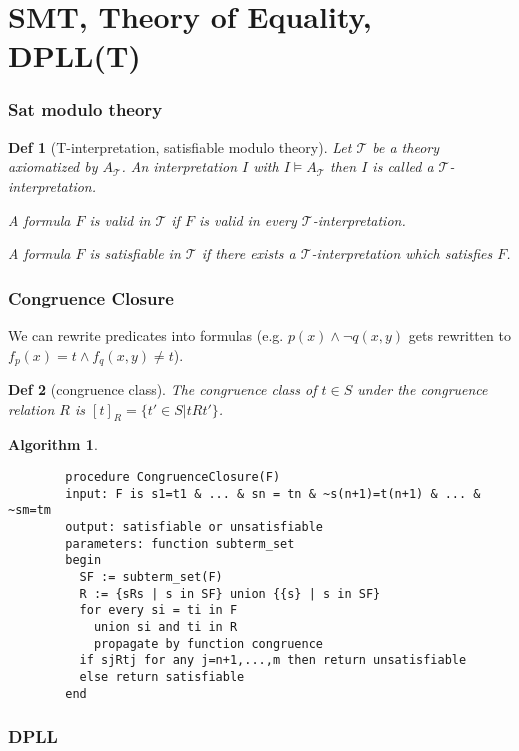 \documentclass[]{article}
\newtheorem*{definition*}{Def}
\newtheorem{algorithm}{Algorithm}
\begin{document}
\section{SMT, Theory of Equality, DPLL(T)}

\subsubsection{Sat modulo theory}

\begin{definition*}[T-interpretation, satisfiable modulo theory]
	Let $\mathcal{T}$ be a theory axiomatized by $A_\mathcal{T}$. An interpretation $I$ with $I \models A_\mathcal{T}$ then $I$ is called a $\mathcal{T}$-interpretation.
	
	A formula $F$ is valid in $\mathcal{T}$ if $F$ is valid in every $\mathcal{T}$-interpretation.
	
	A formula $F$ is satisfiable in $\mathcal{T}$ if there exists a $\mathcal{T}$-interpretation which satisfies $F$.
\end{definition*}

\subsubsection{Congruence Closure}

We can rewrite predicates into formulas (e.g. $p(x) \land \lnot q(x,y)$ gets rewritten to $f_p(x) = t \land f_q(x,y) \not= t$).

\begin{definition*}[congruence class]
	The congruence class of $t\in S$ under the congruence relation $R$ is $[t]_R = \{t' \in S | tRt'\}$.
\end{definition*}

\begin{algorithm}
	\begin{verbatim}
		procedure CongruenceClosure(F)
		input: F is s1=t1 & ... & sn = tn & ~s(n+1)=t(n+1) & ... & ~sm=tm
		output: satisfiable or unsatisfiable
		parameters: function subterm_set
		begin
		  SF := subterm_set(F)
		  R := {sRs | s in SF} union {{s} | s in SF}
		  for every si = ti in F
		    union si and ti in R
		    propagate by function congruence
		  if sjRtj for any j=n+1,...,m then return unsatisfiable
		  else return satisfiable
		end
	\end{verbatim}
\end{algorithm}

\subsubsection{DPLL}
\end{document}
